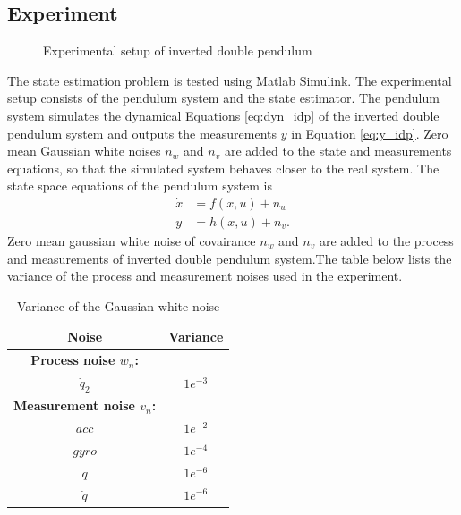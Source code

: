 \subsection{Experiment}
\begin{figure}[h]
    \centering
    
    \caption{Experimental setup of inverted double pendulum}
    \label{fig:exp_idp}  
\end{figure}

The state estimation problem is tested using Matlab Simulink. The experimental setup consists of the pendulum system and the state estimator. The pendulum system simulates the dynamical Equations \ref{eq:dyn_idp} of the inverted double pendulum system and outputs the measurements $y$ in Equation \ref{eq:y_idp}. Zero mean Gaussian white noises $n_w$ and $n_v$ are added to the state and measurements equations, so that the simulated system behaves closer to the real system. The state space equations of the pendulum system is 
\begin{equation}
    \label{eq:sim_idp}
    \begin{split}
    \dot x &= f(x,u) + n_w \\
    y &= h(x,u) + n_v.
    \end{split}
\end{equation}
Zero mean gaussian white noise of covairance $n_w$ and $n_v$ are added to the process and measurements of inverted double pendulum system.The table below lists the variance of the process and measurement noises used in the experiment.
\begin{table}[H]
    \centering
    \begin{tabular}{|c|c|}
    \hline
    Noise &Variance\\ \hline
    \textbf{Process noise $w_n$:}&\hspace{2mm} \\
    $\dot q_2$ &$1e^{-3}$ \\ \hline
    \textbf{Measurement noise $v_n$:}&\hspace{2mm} \\
     $acc$ &$1e^{-2}$ \\
     $gyro$ &$1e^{-4}$ \\
     $q$ &$1e^{-6}$\\ 
     $\dot q$ &$1e^{-6}$ \\ \hline
    \end{tabular}
    \caption{ Variance of the Gaussian white noise}
    \label{tab:idp_noise}
\end{table}

